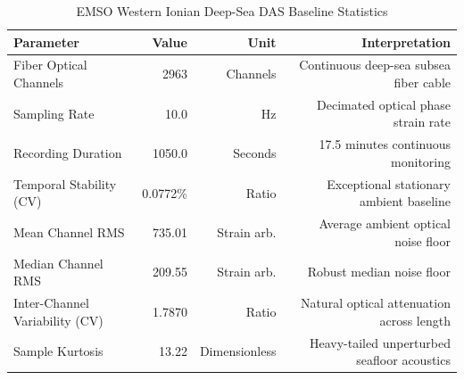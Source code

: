 \begin{table}[htbp]
\centering
\caption{EMSO Western Ionian Deep-Sea DAS Baseline Statistics}
\begin{tabular}{lrrr}
\toprule
Parameter & Value & Unit & Interpretation \\
\midrule
Fiber Optical Channels & 2963 & Channels & Continuous deep-sea subsea fiber cable \\
Sampling Rate & 10.0 & Hz & Decimated optical phase strain rate \\
Recording Duration & 1050.0 & Seconds & 17.5 minutes continuous monitoring \\
Temporal Stability (CV) & 0.0772\% & Ratio & Exceptional stationary ambient baseline \\
Mean Channel RMS & 735.01 & Strain arb. & Average ambient optical noise floor \\
Median Channel RMS & 209.55 & Strain arb. & Robust median noise floor \\
Inter-Channel Variability (CV) & 1.7870 & Ratio & Natural optical attenuation across length \\
Sample Kurtosis & 13.22 & Dimensionless & Heavy-tailed unperturbed seafloor acoustics \\
\bottomrule
\end{tabular}
\end{table}

